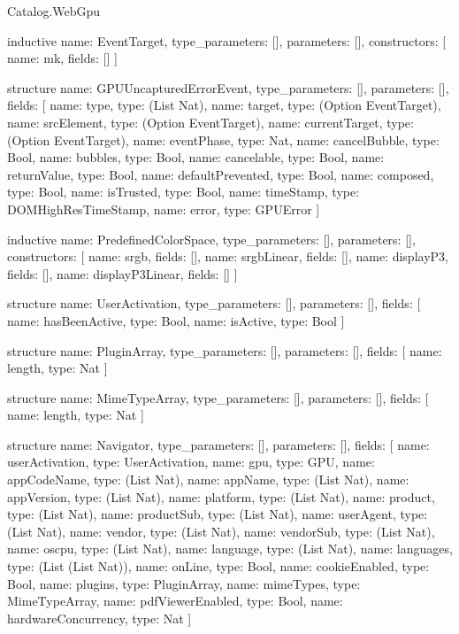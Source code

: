 \begin{lexlean}{Catalog.WebGpu}
\begin{semanticmodule}
inductive{
  name: EventTarget,
  type_parameters: [],
  parameters: [],
  constructors: [
    {name: mk, fields: []}
  ]
}

structure{
  name: GPUUncapturedErrorEvent,
  type_parameters: [],
  parameters: [],
  fields: [
    {name: type, type: (List Nat)},
    {name: target, type: (Option EventTarget)},
    {name: srcElement, type: (Option EventTarget)},
    {name: currentTarget, type: (Option EventTarget)},
    {name: eventPhase, type: Nat},
    {name: cancelBubble, type: Bool},
    {name: bubbles, type: Bool},
    {name: cancelable, type: Bool},
    {name: returnValue, type: Bool},
    {name: defaultPrevented, type: Bool},
    {name: composed, type: Bool},
    {name: isTrusted, type: Bool},
    {name: timeStamp, type: DOMHighResTimeStamp},
    {name: error, type: GPUError}
  ]
}

inductive{
  name: PredefinedColorSpace,
  type_parameters: [],
  parameters: [],
  constructors: [
    {name: srgb, fields: []},
    {name: srgbLinear, fields: []},
    {name: displayP3, fields: []},
    {name: displayP3Linear, fields: []}
  ]
}

structure{
  name: UserActivation,
  type_parameters: [],
  parameters: [],
  fields: [
    {name: hasBeenActive, type: Bool},
    {name: isActive, type: Bool}
  ]
}

structure{
  name: PluginArray,
  type_parameters: [],
  parameters: [],
  fields: [
    {name: length, type: Nat}
  ]
}

structure{
  name: MimeTypeArray,
  type_parameters: [],
  parameters: [],
  fields: [
    {name: length, type: Nat}
  ]
}

structure{
  name: Navigator,
  type_parameters: [],
  parameters: [],
  fields: [
    {name: userActivation, type: UserActivation},
    {name: gpu, type: GPU},
    {name: appCodeName, type: (List Nat)},
    {name: appName, type: (List Nat)},
    {name: appVersion, type: (List Nat)},
    {name: platform, type: (List Nat)},
    {name: product, type: (List Nat)},
    {name: productSub, type: (List Nat)},
    {name: userAgent, type: (List Nat)},
    {name: vendor, type: (List Nat)},
    {name: vendorSub, type: (List Nat)},
    {name: oscpu, type: (List Nat)},
    {name: language, type: (List Nat)},
    {name: languages, type: (List (List Nat))},
    {name: onLine, type: Bool},
    {name: cookieEnabled, type: Bool},
    {name: plugins, type: PluginArray},
    {name: mimeTypes, type: MimeTypeArray},
    {name: pdfViewerEnabled, type: Bool},
    {name: hardwareConcurrency, type: Nat}
  ]
}


\end{semanticmodule}
\end{lexlean}
